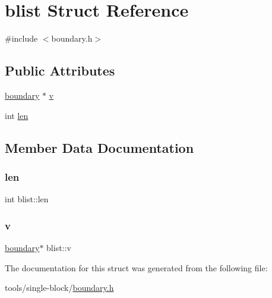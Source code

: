 \hypertarget{structblist}{}\section{blist Struct Reference}
\label{structblist}


{\ttfamily \#include $<$boundary.\+h$>$}

\subsection*{Public Attributes}
\begin{DoxyCompactItemize}
\item 
\mbox{\hyperlink{structboundary}{boundary}} $\ast$ \mbox{\hyperlink{structblist_a9b559074844800a5d9669ab765dd3df0}{v}}
\item 
int \mbox{\hyperlink{structblist_afad93587c24d77ab13555dd9d7d72be3}{len}}
\end{DoxyCompactItemize}


\subsection{Member Data Documentation}
\mbox{\label{structblist_afad93587c24d77ab13555dd9d7d72be3}} 
\subsubsection{\texorpdfstring{len}{len}}
{\footnotesize\ttfamily int blist\+::len}

\mbox{\label{structblist_a9b559074844800a5d9669ab765dd3df0}} 
\subsubsection{\texorpdfstring{v}{v}}
{\footnotesize\ttfamily \mbox{\hyperlink{structboundary}{boundary}}$\ast$ blist\+::v}



The documentation for this struct was generated from the following file\+:\begin{DoxyCompactItemize}
\item 
tools/single-\/block/\mbox{\hyperlink{boundary_8h}{boundary.\+h}}\end{DoxyCompactItemize}
